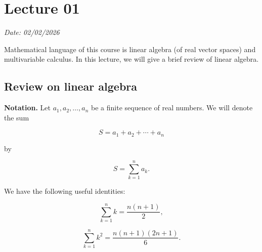 \chapter{Lecture 01}

\hfill {\footnotesize \textit{Date: 02/02/2026}}

Mathematical language of this course is linear algebra (of real vector spaces) and multivariable calculus. In this lecture, we will give a brief review of linear algebra.

\section{Review on linear algebra}

\textbf{Notation.} Let \( a_1, a_2, \ldots, a_n \) be a finite sequence of real numbers. We will denote the sum

\begin{equation}
	S = a_1 + a_2 + \cdots + a_n
	\label{eq:lecture-01-1}
\end{equation}

by

\begin{equation}
	S = \sum_{k=1}^{n} a_k.
	\label{eq:lecture-01-2}
\end{equation}

We have the following useful identities:

\begin{equation}
	\sum_{k=1}^{n} k = \frac{n(n+1)}{2},
	\label{eq:lecture-01-3}
\end{equation}

\begin{equation}
	\sum_{k=1}^{n} k^2 = \frac{n(n+1)(2n+1)}{6}.
	\label{eq:lecture-01-4}
\end{equation}

